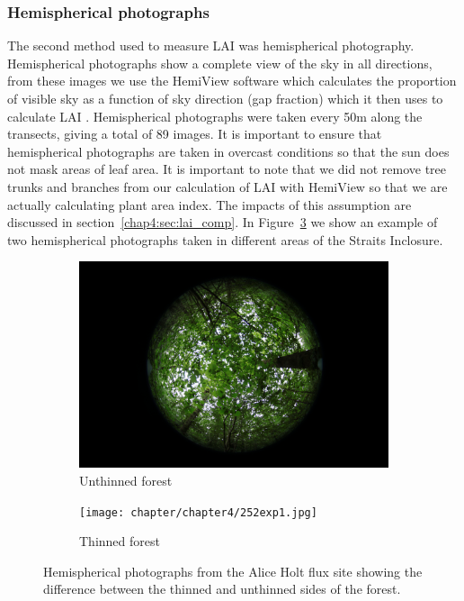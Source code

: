 \subsubsection{Hemispherical photographs} \label{chap4:sec:hemi_photos}

The second method used to measure LAI was hemispherical photography. Hemispherical photographs show a complete view of the sky in all directions, from these images we use the HemiView software \citep{rich1999hemiview} which calculates the proportion of visible sky as a function of sky direction (gap fraction) which it then uses to calculate LAI \citep{Jonckheere2004}. Hemispherical photographs were taken every 50m along the transects, giving a total of 89 images. It is important to ensure that hemispherical photographs are taken in overcast conditions so that the sun does not mask areas of leaf area. It is important to note that we did not remove tree trunks and branches from our calculation of LAI with HemiView so that we are actually calculating plant area index. The impacts of this assumption are discussed in section~\ref{chap4:sec:lai_comp}. In Figure~\ref{chap4:fig:hemiphotos} we show an example of two hemispherical photographs taken in different areas of the Straits Inclosure.

\begin{figure}[ht]
\centering
\begin{subfigure}{.5\textwidth}
  \centering
  \includegraphics[width=.9\linewidth]{chapter/chapter4/043exp2.jpg}
  \caption{Unthinned forest}
  \label{chap4:fig:sub1}
\end{subfigure}%
\begin{subfigure}{.5\textwidth}
  \centering
  \texttt{[image: chapter/chapter4/252exp1.jpg]}
  \caption{Thinned forest}
  \label{chap4:fig:sub2}
\end{subfigure}
\caption{Hemispherical photographs from the Alice Holt flux site showing the difference between the thinned and unthinned sides of the forest.}
\label{chap4:fig:hemiphotos}
\end{figure}

